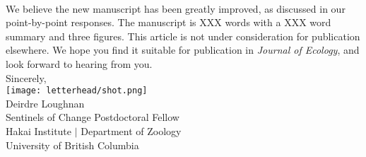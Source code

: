 \documentclass[11pt,a4paper]{article}
\begin{document}
\vspace{1.5ex}\\
We believe the new manuscript has been greatly improved, as discussed in our point-by-point responses. The manuscript is XXX words with a XXX word summary and three figures. This article is not under consideration for publication elsewhere. We hope you find it suitable for publication in \emph{Journal of Ecology}, and look forward to hearing from you. 
\vspace{1.5ex}\\
\noindent Sincerely, \\
\texttt{[image: letterhead/shot.png]} \\ 
\noindent Deirdre Loughnan\\
\noindent Sentinels of Change Postdoctoral Fellow\\ %
\noindent Hakai Institute $|$ Department of Zoology\\
\noindent University of British Columbia
\newpage
\end{document}
